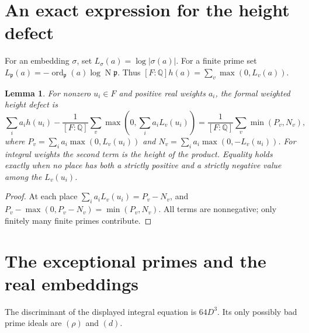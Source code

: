 \documentclass[11pt,a4paper]{article}
\newtheorem{lemma}[theorem]{Lemma}
\newcommand{\Q}{\mathbb Q}\newcommand{\Z}{\mathbb Z}
\DeclareMathOperator{\ord}{ord}\DeclareMathOperator{\N}{N}
\begin{document}
\section{An exact expression for the height defect}
For an embedding $\sigma$, set $L_\sigma(a)=\log|\sigma(a)|$.
For a finite prime set $L_{\mathfrak p}(a)=-\ord_{\mathfrak p}(a)\log\N\mathfrak p$.
Thus $[F:\Q]h(a)=\sum_v\max(0,L_v(a))$.
\begin{lemma}\label{lem:defect}
For nonzero $u_i\in F$ and positive real weights $a_i$, the formal
weighted height defect is
\[
 \sum_i a_i h(u_i)-\frac1{[F:\Q]}
          \sum_v\max\left(0,\sum_i a_iL_v(u_i)\right)
 =\frac1{[F:\Q]}\sum_v\min(P_v,N_v),
\]
where $P_v=\sum_i a_i\max(0,L_v(u_i))$ and
$N_v=\sum_i a_i\max(0,-L_v(u_i))$.
For integral weights the second term is the height of the product.
Equality holds exactly when no place has both a strictly positive and a
strictly negative value among the $L_v(u_i)$.
\end{lemma}
\begin{proof}
At each place $\sum_i a_iL_v(u_i)=P_v-N_v$, and
$P_v-\max(0,P_v-N_v)=\min(P_v,N_v)$. All terms are nonnegative;
only finitely many finite primes contribute.
\end{proof}

\section{The exceptional primes and the real embeddings}
The discriminant of the displayed integral equation is $64D^3$.
Its only possibly bad prime ideals are $(\rho)$ and $(d)$.
\end{document}
